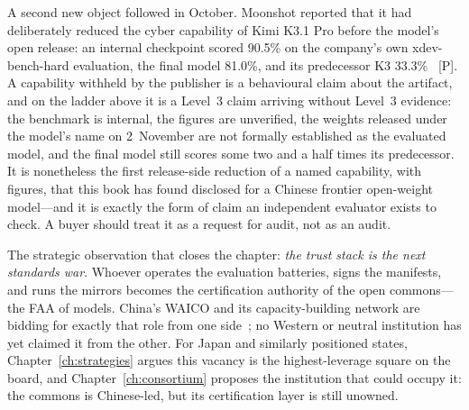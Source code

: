A second new object followed in October. Moonshot reported that it had deliberately reduced the cyber capability of Kimi K3.1 Pro before the model's open release: an internal checkpoint scored 90.5\% on the company's own xdev-bench-hard evaluation, the final model 81.0\%, and its predecessor K3 33.3\%~\cite{mdl-kimi-k31} [P]. A capability withheld by the publisher is a behavioural claim about the artifact, and on the ladder above it is a Level~3 claim arriving without Level~3 evidence: the benchmark is internal, the figures are unverified, the weights released under the model's name on 2~November are not formally established as the evaluated model, and the final model still scores some two and a half times its predecessor. It is nonetheless the first release-side reduction of a named capability, with figures, that this book has found disclosed for a Chinese frontier open-weight model---and it is exactly the form of claim an independent evaluator exists to check. A buyer should treat it as a request for audit, not as an audit.

The strategic observation that closes the chapter: \emph{the trust stack is the next standards war}. Whoever operates the evaluation batteries, signs the manifests, and runs the mirrors becomes the certification authority of the open commons---the FAA of models. China's WAICO and its capacity-building network are bidding for exactly that role from one side~\cite{waico}; no Western or neutral institution has yet claimed it from the other. For Japan and similarly positioned states, Chapter~\ref{ch:strategies} argues this vacancy is the highest-leverage square on the board, and Chapter~\ref{ch:consortium} proposes the institution that could occupy it: the commons is Chinese-led, but its certification layer is still unowned.
